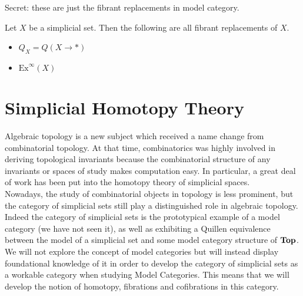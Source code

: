 \documentclass[a4paper]{article}
\begin{document}
Secret: these are just the fibrant replacements in model category. 

\begin{lmm}{}{} Let $X$ be a simplicial set. Then the following are all fibrant replacements of $X$. 
\begin{itemize}
\item $Q_X=Q(X\to\ast)$
\item $\text{Ex}^\infty(X)$
\end{itemize}
\end{lmm}

\pagebreak
\section{Simplicial Homotopy Theory}
Algebraic topology is a new subject which received a name change from combinatorial topology. At that time, combinatorics was highly involved in deriving topological invariants because the combinatorial structure of any invariants or spaces of study makes computation easy. In particular, a great deal of work has been put into the homotopy theory of simplicial spaces. \\

Nowadays, the study of combinatorial objects in topology is less prominent, but the category of simplicial sets still play a distinguished role in algebraic topology. Indeed the category of simplicial sets is the prototypical example of a model category (we have not seen it), as well as exhibiting a Quillen equivalence between the model of a simplicial set and some model category structure of $\bold{Top}$. We will not explore the concept of model categories but will instead display foundational knowledge of it in order to develop the category of simplicial sets as a workable category when studying Model Categories. This means that we will develop the notion of homotopy, fibrations and cofibrations in this category. 
\end{document}
